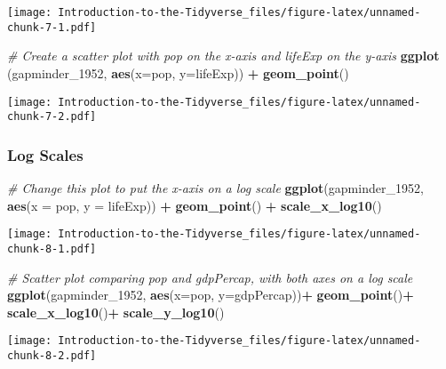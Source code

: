 \documentclass[
]{article}
\newenvironment{Shaded}{\begin{snugshade}}{\end{snugshade}}
\newcommand{\CommentTok}[1]{\textcolor[rgb]{0.56,0.35,0.01}{\textit{#1}}}
\newcommand{\DataTypeTok}[1]{\textcolor[rgb]{0.13,0.29,0.53}{#1}}
\newcommand{\DecValTok}[1]{\textcolor[rgb]{0.00,0.00,0.81}{#1}}
\newcommand{\KeywordTok}[1]{\textcolor[rgb]{0.13,0.29,0.53}{\textbf{#1}}}
\newcommand{\NormalTok}[1]{#1}
\newcommand{\OperatorTok}[1]{\textcolor[rgb]{0.81,0.36,0.00}{\textbf{#1}}}
\newcommand{\StringTok}[1]{\textcolor[rgb]{0.31,0.60,0.02}{#1}}
\begin{document}
\texttt{[image: Introduction-to-the-Tidyverse\_files/figure-latex/unnamed-chunk-7-1.pdf]}

\begin{Shaded}
\begin{Highlighting}[]
\CommentTok{# Create a scatter plot with pop on the x-axis and lifeExp on the y-axis}
\KeywordTok{ggplot}\NormalTok{ (gapminder_}\DecValTok{1952}\NormalTok{, }\KeywordTok{aes}\NormalTok{(}\DataTypeTok{x=}\NormalTok{pop, }\DataTypeTok{y=}\NormalTok{lifeExp)) }\OperatorTok{+}
\KeywordTok{geom_point}\NormalTok{()}
\end{Highlighting}
\end{Shaded}

\texttt{[image: Introduction-to-the-Tidyverse\_files/figure-latex/unnamed-chunk-7-2.pdf]}

\hypertarget{log-scales}{%
\subsubsection{Log Scales}\label{log-scales}}

\begin{Shaded}
\begin{Highlighting}[]
\CommentTok{# Change this plot to put the x-axis on a log scale}
\KeywordTok{ggplot}\NormalTok{(gapminder_}\DecValTok{1952}\NormalTok{, }\KeywordTok{aes}\NormalTok{(}\DataTypeTok{x =}\NormalTok{ pop, }\DataTypeTok{y =}\NormalTok{ lifeExp)) }\OperatorTok{+}
\StringTok{  }\KeywordTok{geom_point}\NormalTok{() }\OperatorTok{+}
\StringTok{  }\KeywordTok{scale_x_log10}\NormalTok{()}
\end{Highlighting}
\end{Shaded}

\texttt{[image: Introduction-to-the-Tidyverse\_files/figure-latex/unnamed-chunk-8-1.pdf]}

\begin{Shaded}
\begin{Highlighting}[]
\CommentTok{# Scatter plot comparing pop and gdpPercap, with both axes on a log scale}
\KeywordTok{ggplot}\NormalTok{(gapminder_}\DecValTok{1952}\NormalTok{, }\KeywordTok{aes}\NormalTok{(}\DataTypeTok{x=}\NormalTok{pop, }\DataTypeTok{y=}\NormalTok{gdpPercap))}\OperatorTok{+}
\KeywordTok{geom_point}\NormalTok{()}\OperatorTok{+}
\KeywordTok{scale_x_log10}\NormalTok{()}\OperatorTok{+}
\KeywordTok{scale_y_log10}\NormalTok{()}
\end{Highlighting}
\end{Shaded}

\texttt{[image: Introduction-to-the-Tidyverse\_files/figure-latex/unnamed-chunk-8-2.pdf]}
\end{document}
